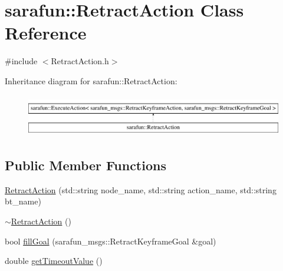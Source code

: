 \hypertarget{classsarafun_1_1RetractAction}{\section{sarafun\-:\-:Retract\-Action Class Reference}
\label{classsarafun_1_1RetractAction}
}


{\ttfamily \#include $<$Retract\-Action.\-h$>$}

Inheritance diagram for sarafun\-:\-:Retract\-Action\-:\begin{figure}[H]
\begin{center}
\leavevmode
\includegraphics[height=1.863561cm]{classsarafun_1_1RetractAction}
\end{center}
\end{figure}
\subsection*{Public Member Functions}
\begin{DoxyCompactItemize}
\item 
\hyperlink{classsarafun_1_1RetractAction_a0f56a3d5ff6c07f48bbd3cede93f0a81}{Retract\-Action} (std\-::string node\-\_\-name, std\-::string action\-\_\-name, std\-::string bt\-\_\-name)
\item 
\hyperlink{classsarafun_1_1RetractAction_adb37a0fb90d06636009f90b7565f00cf}{$\sim$\-Retract\-Action} ()
\item 
bool \hyperlink{classsarafun_1_1RetractAction_ad0db1c2615d68603bc972ffa26049a70}{fill\-Goal} (sarafun\-\_\-msgs\-::\-Retract\-Keyframe\-Goal \&goal)
\item 
double \hyperlink{classsarafun_1_1RetractAction_af95bb8d3826dbe1444a8a3e12d8596b0}{get\-Timeout\-Value} ()
\end{DoxyCompactItemize}


